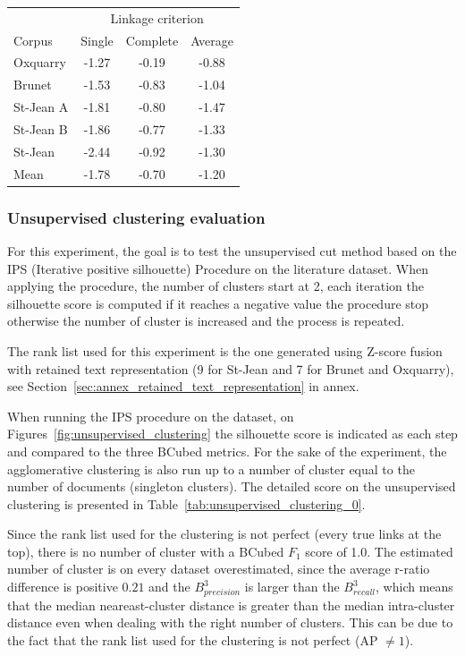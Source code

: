 \begin{table}
  \label{tab:clustering_linkages_distance_thresholds}
  \begin{tabular}{l c c c}
    \toprule
           & \multicolumn{3}{c}{Linkage criterion} \\
    Corpus & Single & Complete & Average \\
    \midrule
    Oxquarry  & -1.27 & -0.19 & -0.88 \\
    Brunet    & -1.53 & -0.83 & -1.04 \\
    St-Jean A & -1.81 & -0.80 & -1.47 \\
    St-Jean B & -1.86 & -0.77 & -1.33 \\
    St-Jean   & -2.44 & -0.92 & -1.30 \\
    \midrule
    Mean      & -1.78 & -0.70 & -1.20 \\
    \bottomrule
  \end{tabular}
\end{table}

\subsubsection{Unsupervised clustering evaluation}

For this experiment, the goal is to test the unsupervised cut method based on the IPS (Iterative positive silhouette) Procedure on the literature dataset.
When applying the procedure, the number of clusters start at 2, each iteration the silhouette score is computed if it reaches a negative value the procedure stop otherwise the number of cluster is increased and the process is repeated.

The rank list used for this experiment is the one generated using Z-score fusion with retained text representation (9 for St-Jean and 7 for Brunet and Oxquarry), see Section~\ref{sec:annex_retained_text_representation} in annex.

When running the IPS procedure on the dataset, on Figures~\ref{fig:unsupervised_clustering} the silhouette score is indicated as each step and compared to the three BCubed metrics.
For the sake of the experiment, the agglomerative clustering is also run up to a number of cluster equal to the number of documents (singleton clusters).
The detailed score on the unsupervised clustering is presented in Table~\ref{tab:unsupervised_clustering_0}.

Since the rank list used for the clustering is not perfect (every true links at the top), there is no number of cluster with a BCubed $F_1$ score of 1.0.
The estimated number of cluster is on every dataset overestimated, since the average r-ratio difference is positive $0.21$ and the $B^3_{precision}$ is larger than the $B^3_{recall}$, which means that the median neareast-cluster distance is greater than the median intra-cluster distance even when dealing with the right number of clusters.
This can be due to the fact that the rank list used for the clustering is not perfect (AP $\neq 1$).

